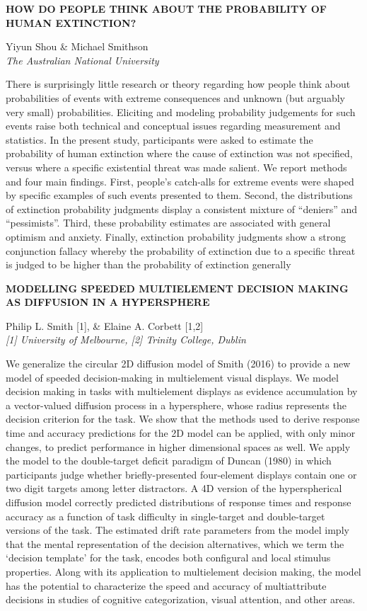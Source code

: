\documentclass[]{article}
\begin{document}
\textbf{HOW DO PEOPLE THINK ABOUT THE PROBABILITY OF HUMAN EXTINCTION?}

Yiyun Shou \& Michael Smithson\\
\emph{The Australian National University }

There is surprisingly little research or theory regarding how people
think about probabilities of events with extreme consequences and
unknown (but arguably very small) probabilities. Eliciting and modeling
probability judgements for such events raise both technical and
conceptual issues regarding measurement and statistics. In the present
study, participants were asked to estimate the probability of human
extinction where the cause of extinction was not specified, versus where
a specific existential threat was made salient. We report methods and
four main findings. First, people's catch-alls for extreme events were
shaped by specific examples of such events presented to them. Second,
the distributions of extinction probability judgments display a
consistent mixture of ``deniers'' and ``pessimists''. Third, these
probability estimates are associated with general optimism and anxiety.
Finally, extinction probability judgments show a strong conjunction
fallacy whereby the probability of extinction due to a specific threat
is judged to be higher than the probability of extinction generally\\
\pagebreak  

\textbf{MODELLING SPEEDED MULTIELEMENT DECISION MAKING AS DIFFUSION IN A
HYPERSPHERE}

Philip L. Smith {[}1{]}, \& Elaine A. Corbett {[}1,2{]}\\
\emph{{[}1{]} University of Melbourne, {[}2{]} Trinity College, Dublin}

We generalize the circular 2D diffusion model of Smith (2016) to provide
a new model of speeded decision-making in multielement visual displays.
We model decision making in tasks with multielement displays as evidence
accumulation by a vector-valued diffusion process in a hypersphere,
whose radius represents the decision criterion for the task. We show
that the methods used to derive response time and accuracy predictions
for the 2D model can be applied, with only minor changes, to predict
performance in higher dimensional spaces as well. We apply the model to
the double-target deficit paradigm of Duncan (1980) in which
participants judge whether briefly-presented four-element displays
contain one or two digit targets among letter distractors. A 4D version
of the hyperspherical diffusion model correctly predicted distributions
of response times and response accuracy as a function of task difficulty
in single-target and double-target versions of the task. The estimated
drift rate parameters from the model imply that the mental
representation of the decision alternatives, which we term the `decision
template' for the task, encodes both configural and local stimulus
properties. Along with its application to multielement decision making,
the model has the potential to characterize the speed and accuracy of
multiattribute decisions in studies of cognitive categorization, visual
attention, and other areas.\\
\pagebreak  
\end{document}

